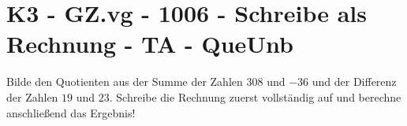 \section{K3 - GZ.vg - 1006 - Schreibe als Rechnung - TA - QueUnb}

\begin{beispiel}{0} %
				Bilde den Quotienten aus der Summe der Zahlen $308$ und $-36$ und der Differenz der Zahlen $19$ und $23$. Schreibe die Rechnung zuerst vollständig auf und berechne anschließend das Ergebnis!
				
\end{beispiel}